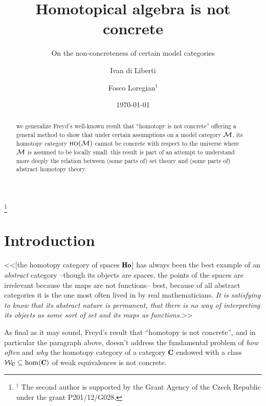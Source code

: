 \documentclass[a4paper, 10pt]{amsart}
\begin{document}
\title{Homotopical algebra is not concrete}
\subtitle{On the non-concreteness of certain model categories}

\author{Ivan di Liberti}
\author{Fosco Loregian$^\dag$}
\thanks{$^\dag$ The second author is supported by the Grant Agency of the Czech Republic under the grant \textsc{P}201/12/\textsc{G}028.}
\address{
$^\dag$Department of Mathematics and Statistics\newline
Masaryk University, Faculty of Sciences\newline
Kotl\'{a}\v{r}sk\'{a} 2, 611 37 Brno, Czech Republic\newline
\href{mailto:diliberti@math.muni.cz}{\sf diliberti@math.muni.cz}\newline
\href{mailto:loregianf@math.muni.cz}{\sf loregianf@math.muni.cz}
}

\date{\today}
\maketitle 

\begin{abstract}
we generalize Freyd's well-known result that ``homotopy is not concrete''
offering a general method to show that under certain assumptions on a model
category $\mathcal{M}$, its homotopy category $\textsc{ho}(\mathcal{M})$ cannot be concrete with respect
to the universe where $\mathcal{M}$ is assumed to be locally small. this result is part
of an attempt to understand more deeply the relation between (some parts of) set
theory and (some parts of) abstract homotopy theory.
\end{abstract}
\section{Introduction}
\begin{aquote}{\cite{fconc}}
<<[the homotopy category of spaces $\cate{Ho}$] has always been the best example
of an \emph{abstract} category --though its objects are spaces, the points of
the spaces are irrelevant because the maps are not functions-- best, because of
all abstract categories it is the one most often lived in by real
mathematicians. \emph{It is satisfying to know that its abstract nature is
permanent, that there is no way of interpreting its objects as some sort of set
and its maps as functions.}>>
\end{aquote}
As final as it may sound, Freyd's result that ``homotopy is not concrete'', and
in particular the paragraph above, doesn't address the fundamental problem of
\emph{how often} and \emph{why} the homotopy category of a category $\C$ endowed
with a class $\W_\C \subseteq \hom(\C)$ of weak equivalences is not concrete.
\end{document}

